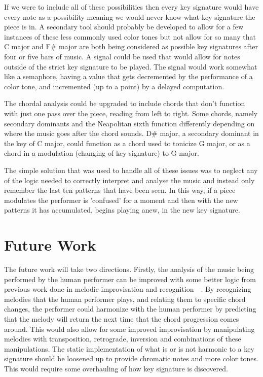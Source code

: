 \documentclass[12pt]{ucthesis}
\begin{document}
{If we were to include all of these possibilities then every key signature would have every note as a possibility meaning we would never know what key signature the piece is in. A secondary tool should probably be developed to allow for a few instances of these less commonly used color tones but not allow for so many that C major and F\# major are both being considered as possible key signatures after four or five bars of music. A signal could be used that would allow for notes outside of the strict key signature to be played. The signal would work somewhat like a semaphore, having a value that gets decremented by the performance of a color tone, and incremented (up to a point) by a delayed computation. 

The chordal analysis could be upgraded to include chords that don't function with just one pass over the piece, reading from left to right. Some chords, namely secondary dominants and the Neapolitan sixth function differently depending on where the music goes after the chord sounds. D\# major, a secondary dominant in the key of C major, could function as a chord used to tonicize G major, or as a chord in a modulation (changing of key signature) to G major. 

The simple solution that was used to handle all of these issues was to neglect any of the logic needed to correctly interpret and analyse the music and instead only remember the last ten patterns that have been seen. In this way, if a piece modulates the performer is 'confused' for a moment and then with the new patterns it has accumulated, begins playing anew, in the new key signature. 

\chapter{Future Work}
\label{future}

The future work will take two directions. Firstly, the analysis of the music being performed by the human performer can be improved with some better logic from previous work done in melodic improvisation and recognition~\cite{MelodicImprovisation}~\cite{MelodicRecognition}. By recognizing melodies that the human performer plays, and relating them to specific chord changes, the performer could harmonize with the human performer by predicting that the melody will return the next time that the chord progression comes around. This would also allow for some improved improvisation by manipulating melodies with transposition, retrograde, inversion and combinations of these manipulations. The static implementation of what is or is not harmonic to a key signature should be loosened up to provide chromatic notes and more color tones. This would require some overhauling of how key signature is discovered. 

}
\end{document}

